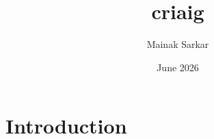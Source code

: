\documentclass{article}
\title{criaig}
\author{Mainak Sarkar}
\date{June 2026}
\begin{document}
\maketitle

\section{Introduction}
\end{document}
